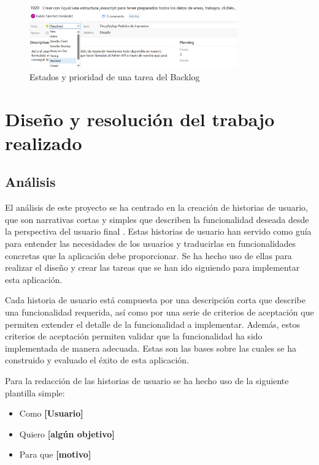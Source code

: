 \documentclass[11pt]{article}
\begin{document}
\begin{figure}[H]
    \centering
    \includegraphics[width=0.8\textwidth]{imagenes/Estados y prioridad de tarea.png}
    \caption{\label{fig:4}Estados y prioridad de una tarea del Backlog}
    \vspace{\fill}
\end{figure}


\clearpage
\section{Diseño y resolución del trabajo realizado}

\subsection{Análisis}
El análisis de este proyecto se ha centrado en la creación de historias de usuario, que son narrativas 
cortas y simples que describen la funcionalidad deseada desde la perspectiva del usuario final \cite{hu}. 
Estas historias de usuario han servido como guía para entender las necesidades de los usuarios y traducirlas en 
funcionalidades concretas que la aplicación debe proporcionar. Se ha hecho uso de ellas para realizar el diseño y crear
las tareas que se han ido siguiendo para implementar esta aplicación.

Cada historia de usuario está compuesta por una descripción corta que describe una funcionalidad requerida, así como por una serie de criterios de aceptación que 
permiten extender el detalle de la funcionalidad a implementar. Además, estos criterios de aceptación permiten validar que la funcionalidad 
ha sido implementada de manera adecuada. Estas son las bases sobre las cuales se ha construido y evaluado el éxito de esta aplicación.

Para la redacción de las historias de usuario se ha hecho uso de la siguiente plantilla simple:

\begin{itemize}
    \item Como \textbf{[Usuario]}
    \item Quiero \textbf{[algún objetivo]}
    \item Para que \textbf{[motivo]}
\end{itemize}
\end{document}
